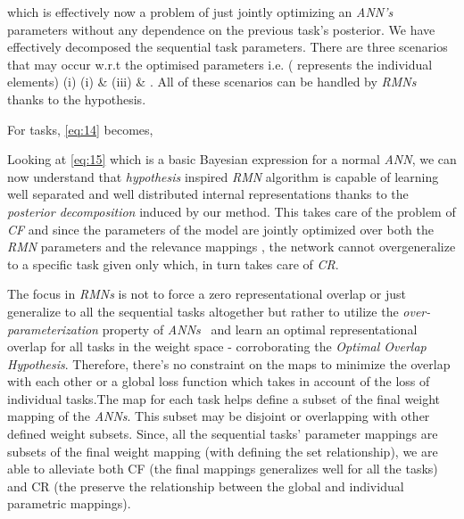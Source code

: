 \documentclass{article}
\begin{document}
which is effectively now a problem of just jointly optimizing an \textit{ANN's} parameters  without any dependence on the previous task's posterior. We have effectively decomposed the sequential task parameters.
There are three scenarios that may occur w.r.t the optimised parameters i.e. ( represents the individual elements) (i)   (i)  \&  (iii)  \& . All of these scenarios can be handled by \textit{RMNs} thanks to the  hypothesis.

For  tasks, \eqref{eq:14} becomes,

Looking at \eqref{eq:15} which is a basic Bayesian expression for a normal \textit{ANN}, we can now understand that  \textit{hypothesis} inspired \textit{RMN} algorithm is capable of learning well separated and well distributed internal representations thanks to the \textit{posterior decomposition} induced by our method. This takes care of the problem of \textit{CF} and since the parameters of the model are jointly optimized over both the \textit{RMN} parameters  and the relevance mappings , the network cannot overgeneralize to a specific task given only  which, in turn takes care of \textit{CR}.

The focus in \textit{RMNs} is not to force a zero representational overlap or just generalize to all the sequential tasks altogether but rather to utilize the \textit{over-parameterization} property of \textit{ANNs}~\cite{frankle2019lottery} and learn an optimal representational overlap for all tasks in the weight space - corroborating the \textit{Optimal Overlap Hypothesis}. Therefore, there's no constraint on the maps  to minimize the overlap with each other or a global loss function which takes in account of the loss of individual tasks.The map  for each task helps define a subset of the final weight mapping of the \textit{ANNs}. This subset may be disjoint or overlapping with other  defined weight subsets. Since, all the sequential tasks' parameter mappings are subsets of the final weight mapping (with  defining the set relationship), we are able to alleviate both CF (the final mappings generalizes well for all the tasks) and CR (the  preserve the relationship between the global and individual parametric mappings).


\iffalse
\textbf{The Lottery Ticket Hypothesis and Relevance Mapping}
A question arises as to whether the slight constraints introduced in the weight space by our algorithm worsen the performance of the sequential tasks. The Lottery ticket Hypothesis introduced in a seminal work~\cite{frankle2019lottery} states that - \textit{A randomly-initialized, dense neural network contains a subnet-work that is initialized such that—when trained in isolation—it can match the test accuracy of the original network after training for at most the same number of iterations.} Additionally, our method doesn't remove the previous tasks parameters and subsequent methods can choose to use their predecessors parameters optimally. Therefore, no performance drop is expected in our method and results from our experiments prove the same.
\fi
\end{document}
